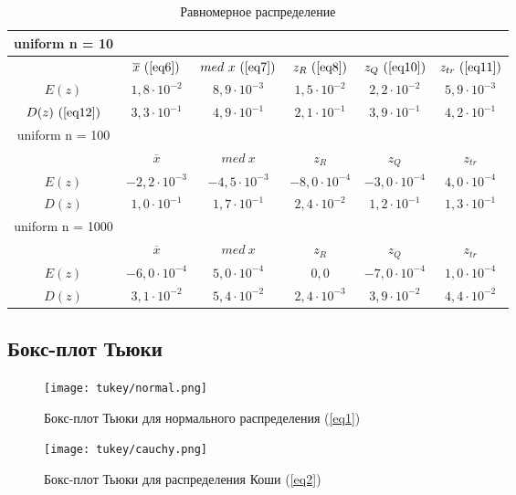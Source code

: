 \begin{table}[H]
    \centering
    \begin{tabular}{ |c|c|c|c|c|c| }
 \hline
 uniform n = 10 & & & & & \\ 
 \hline
  &$\overline{x}\ (\ref{eq6})$ & $med\ x\ (\ref{eq7})$ & $z_{R}\ (\ref{eq8})$ & $z_{Q}\ (\ref{eq10})$ & $z_{tr}\ (\ref{eq11})$\\ 
 \hline
 $E(z)$ & $1,8 \cdot 10^{-2}$ & $8,9 \cdot 10^{-3}$ & $1,5 \cdot 10^{-2}$ & $2,2 \cdot 10^{-2}$ & $5,9 \cdot 10^{-3}$ \\ 
 \hline
 $D(z)\ (\ref{eq12})$ & $3,3 \cdot 10^{-1}$ & $4,9 \cdot 10^{-1}$ & $2,1 \cdot 10^{-1}$ & $3,9 \cdot 10^{-1}$ & $4,2 \cdot 10^{-1}$ \\ 
 \hline\hline
 uniform n = 100 & & & & & \\
 \hline
 &$\overline{x}$ & $med\ x$ & $z_{R}$ & $z_{Q}$ & $z_{tr}$\\ 
 \hline
 $E(z)$ & $-2,2 \cdot 10^{-3}$ & $-4,5 \cdot 10^{-3}$ & $-8,0 \cdot 10^{-4}$ & $-3,0 \cdot 10^{-4}$ & $4,0 \cdot 10^{-4}$ \\ 
 \hline
 $D(z)$ & $1,0 \cdot 10^{-1}$ & $1,7 \cdot 10^{-1}$ & $2,4 \cdot 10^{-2}$ & $1,2 \cdot 10^{-1}$ & $1,3 \cdot 10^{-1}$ \\ 
 \hline\hline
 uniform n = 1000 & & & & & \\
 \hline
 &$\overline{x}$ & $med\ x$ & $z_{R}$ & $z_{Q}$ & $z_{tr}$\\ 
 \hline
 $E(z)$ & $-6,0 \cdot 10^{-4}$ & $5,0 \cdot 10^{-4}$ & $0,0$ & $-7,0 \cdot 10^{-4}$ & $1,0 \cdot 10^{-4}$ \\ 
 \hline
 $D(z)$ & $3,1 \cdot 10^{-2}$  &$5,4 \cdot 10^{-2}$ & $2,4 \cdot 10^{-3}$ &  $3,9 \cdot 10^{-2}$ & $4,4 \cdot 10^{-2}$ \\
 \hline
\end{tabular}
    \caption{Равномерное распределение}
    \label{table:5}
\end{table}

\subsection{Бокс-плот Тьюки}

\begin{figure}[H]
    \centering
    \texttt{[image: tukey/normal.png]}
    \caption{Бокс-плот Тьюки для нормального распределения (\ref{eq1})}
    \label{fig6}
\end{figure}

\begin{figure}[H]
    \centering
    \texttt{[image: tukey/cauchy.png]}
    \caption{Бокс-плот Тьюки для распределения Коши (\ref{eq2})}
    \label{fig7}
\end{figure}

